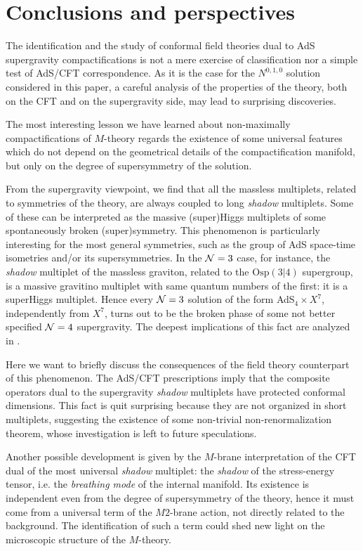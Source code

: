\documentclass[a4paper,12pt]{article}
\def\n010{N^{0,1,0}}
\begin{document}
\section{Conclusions and perspectives}
The identification and the study of conformal field theories dual to
AdS supergravity compactifications is not a mere exercise of
classification nor a simple test of AdS/CFT correspondence.
As it is the case for the $\n010$ solution considered in this paper, a
careful analysis of the properties of the theory, both on the CFT and
on the supergravity side, may lead to surprising discoveries.
\par
The most interesting lesson we have learned about non-maximally
compactifications of $M$-theory regards the existence of some
universal features which do not depend on the geometrical details of
the compactification manifold, but only on the degree of
supersymmetry of the solution.
\par
From the supergravity viewpoint, we find that all the massless
multiplets, related to symmetries of the theory, are always coupled
to long {\it shadow} multiplets.
Some of these can be interpreted as the massive (super)Higgs multiplets
of some spontaneously broken (super)symmetry.
This phenomenon is particularly interesting for the most general
symmetries, such as the group of AdS space-time isometries and/or
its supersymmetries.
In the ${\cal N}=3$ case, for instance, the {\it shadow} multiplet
of the massless graviton, related to the $\mathrm{Osp(3|4)}$ supergroup,
is a massive gravitino multiplet with same quantum numbers of the
first: it is a superHiggs multiplet.
Hence every ${\cal N}=3$ solution of the form AdS$_4\times X^7$,
independently from $X^7$, turns out to be the broken phase of some
not better specified ${\cal N}=4$ supergravity.
The deepest implications of this fact are analyzed in \cite{noinext}.
\par
Here we want to briefly discuss the consequences of the field theory
counterpart of this phenomenon.
The AdS/CFT prescriptions imply that the composite operators
dual to the supergravity {\it shadow} multiplets have protected
conformal dimensions.
This fact is quit surprising because they are not organized in short
multiplets, suggesting the existence of some non-trivial
non-renormalization theorem, whose investigation is left to future
speculations.
\par
Another possible development is given by the $M$-brane interpretation
of the CFT dual of the most universal {\it shadow} multiplet: the
{\it shadow} of the stress-energy tensor, i.e. the {\it breathing
mode} of the internal manifold.
Its existence is independent even from the degree of supersymmetry of
the theory, hence it must come from a universal term of the $M2$-brane
action, not directly related to the background.
The identification of such a term could shed new light on the microscopic
structure of the $M$-theory.
\end{document}
